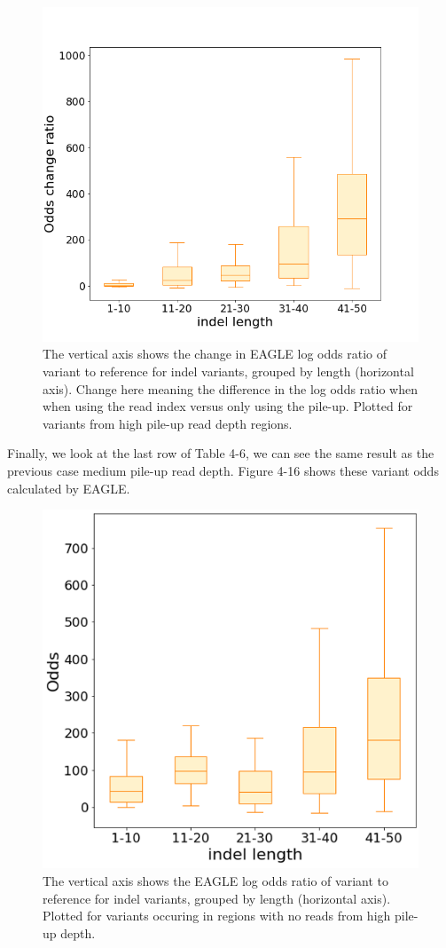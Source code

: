 \begin{figure}[H]
    \centering
    \includegraphics[width=0.6\columnwidth]{body/image/4-15.png}
    \captionsetup{labelfont=bf}
    \renewcommand{\baselinestretch}{1.0}
    \caption[high pile-up read depth odds change ratio]{The vertical axis shows the change in EAGLE log odds ratio of variant to reference for indel variants, grouped by length (horizontal axis).  Change here meaning the difference in the log odds ratio when when using the read index versus only using the pile-up.  Plotted for variants from high pile-up read depth regions.}
    \label{f4-15}
\end{figure}

Finally, we look at the last row of Table 4-6, we can see the same result as the previous case medium pile-up read depth. Figure 4-16 shows these variant odds calculated by EAGLE.

\begin{figure}[H]
    \centering
    \includegraphics[width=0.6\columnwidth]{body/image/4-16.png}
    \captionsetup{labelfont=bf}
    \renewcommand{\baselinestretch}{1.0}
    \caption[no reads with variants from high pile-up depth odds ratio]{The vertical axis shows the EAGLE log odds ratio of variant to reference for indel variants, grouped by length (horizontal axis).  Plotted for variants occuring in regions with no reads from high pile-up depth.}
    \label{f4-16}
\end{figure}


